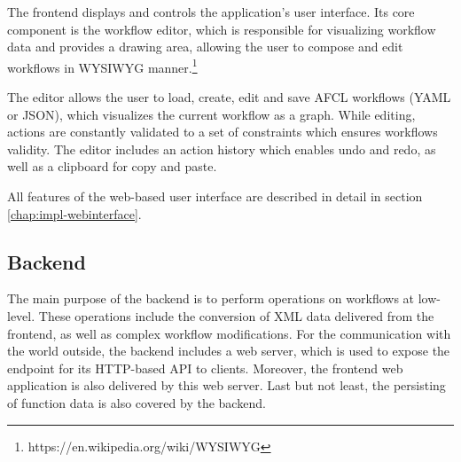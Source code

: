 \documentclass[a4paper,top=25mm,bottom=25mm,12pt,pdftex,halfparskip,twoside,bibtotoc,numbers=noenddot]{scrbook}
\begin{document}


The frontend displays and controls the application's user interface. Its core component is the workflow editor, which is responsible for visualizing workflow data and provides a drawing area, allowing the user to compose and edit workflows in WYSIWYG manner.\footnote{https://en.wikipedia.org/wiki/WYSIWYG}



The editor allows the user to load, create, edit and save AFCL workflows (YAML or JSON), which visualizes the current workflow as a graph. While editing, actions are constantly validated to a set of constraints which ensures workflows validity. The editor includes an action history which enables undo and redo, as well as a clipboard for copy and paste.


All features of the web-based user interface are described in detail in section \ref{chap:impl-webinterface}.




\subsection{Backend}

The main purpose of the backend is to perform operations on workflows at low-level. These operations include the conversion of XML data delivered from the frontend, as well as complex workflow modifications.
For the communication with the world outside, the backend includes a web server, which is used to expose the endpoint for its HTTP-based API to clients. Moreover, the frontend web application is also delivered by this web server. 
Last but not least, the persisting of function data is also covered by the backend.
\end{document}
